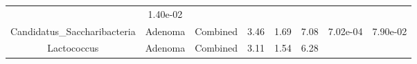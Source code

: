 \documentclass[12pt,]{article}
\begin{document}
\begin{longtable}[]{@{}cccccccc@{}}
\begin{minipage}[t]{0.06\columnwidth}
\end{minipage} & \begin{minipage}[t]{0.06\columnwidth}\centering\strut
1.40e-02\strut
\end{minipage}\tabularnewline
\begin{minipage}[t]{0.19\columnwidth}\centering\strut
Candidatus\_Saccharibacteria\strut
\end{minipage} & \begin{minipage}[t]{0.07\columnwidth}\centering\strut
Adenoma\strut
\end{minipage} & \begin{minipage}[t]{0.09\columnwidth}\centering\strut
Combined\strut
\end{minipage} & \begin{minipage}[t]{0.03\columnwidth}\centering\strut
3.46\strut
\end{minipage} & \begin{minipage}[t]{0.14\columnwidth}\centering\strut
1.69\strut
\end{minipage} & \begin{minipage}[t]{0.14\columnwidth}\centering\strut
7.08\strut
\end{minipage} & \begin{minipage}[t]{0.06\columnwidth}\centering\strut
7.02e-04\strut
\end{minipage} & \begin{minipage}[t]{0.06\columnwidth}\centering\strut
7.90e-02\strut
\end{minipage}\tabularnewline
\begin{minipage}[t]{0.19\columnwidth}\centering\strut
Lactococcus\strut
\end{minipage} & \begin{minipage}[t]{0.07\columnwidth}\centering\strut
Adenoma\strut
\end{minipage} & \begin{minipage}[t]{0.09\columnwidth}\centering\strut
Combined\strut
\end{minipage} & \begin{minipage}[t]{0.03\columnwidth}\centering\strut
3.11\strut
\end{minipage} & \begin{minipage}[t]{0.14\columnwidth}\centering\strut
1.54\strut
\end{minipage} & \begin{minipage}[t]{0.14\columnwidth}\centering\strut
6.28\strut
\end{minipage} & \begin{minipage}[t]{0.06\columnwidth}\centering\strut

\end{minipage}
\end{longtable}
\end{document}
